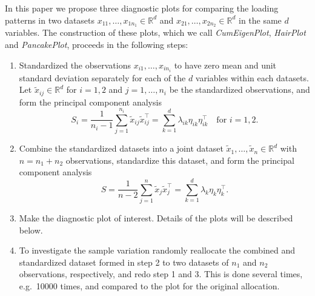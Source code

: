 \documentclass[titlepage,11pt,twoside]{article}
\newcommand{\RR}{\mathbb{R}}
\begin{document}
In this paper we propose three diagnostic plots for comparing the loading patterns in two datasets $x_{11},\dotsc,x_{1 n_1} \in \RR^d$ and $x_{21},\dotsc,x_{2 n_2} \in \RR^d$ in the same $d$ variables. The construction of these plots, which we call \emph{CumEigenPlot}, \emph{HairPlot} and \emph{PancakePlot}, proceeds in the following steps:
\begin{enumerate}
\item Standardized the observations $x_{i1},\dotsc,x_{i n_i}$ to have zero mean and unit standard deviation separately for each of the $d$ variables within each datasets. Let $\tilde{x}_{ij} \in \RR^d$ for $i=1,2$ and $j=1,\dotsc,n_i$ be the standardized observations, and form the principal component analysis
\begin{equation*}
S_i = \frac{1}{n_i-1} \sum_{j=1}^{n_i} \tilde{x}_{ij} \tilde{x}_{ij}^\top = \sum_{k=1}^d \lambda_{ik} \eta_{ik} \eta_{ik}^\top \quad \text{for $i=1,2$.} 
\end{equation*}
\item Combine the standardized datasets into a joint dataset $\tilde{x}_1,\dotsc,\tilde{x}_n \in \RR^d$ with $n=n_1+n_2$ observations, standardize this dataset, and form the principal component analysis
\begin{equation*}
S = \frac{1}{n-2} \sum_{j=1}^n \tilde{x}_j \tilde{x}_j^\top = \sum_{k=1}^d \lambda_k \eta_k \eta_k^\top.
\end{equation*}
\item Make the diagnostic plot of interest. Details of the plots will be described below.
\item To investigate the sample variation randomly reallocate the combined and standardized dataset formed in step 2 to two datasets of $n_1$ and $n_2$ observations, respectively, and redo step 1 and 3. This is done several times, e.g.\ 10000 times, and compared to the plot for the original allocation.
\end{enumerate} 
\end{document}
